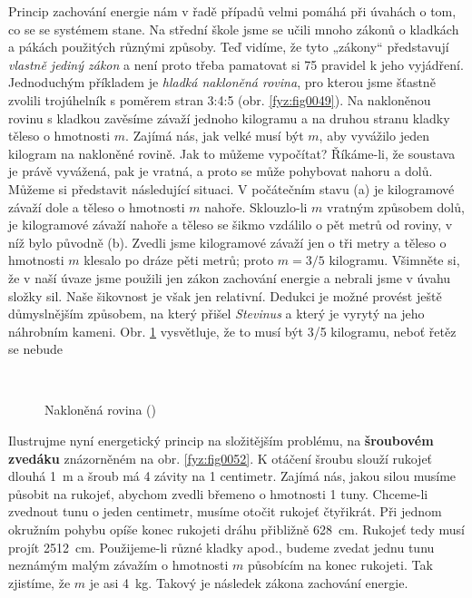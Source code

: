     Princip zachování energie nám v řadě případů velmi pomáhá při úvahách o tom, co se se systémem 
    stane. Na střední škole jsme se učili mnoho zákonů o kladkách a pákách použitých různými 
    způsoby. Teď vidíme, že tyto „zákony“ představují \emph{vlastně jediný zákon} a není proto 
    třeba pamatovat si \num{75} pravidel k jeho vyjádření. Jednoduchým příkladem je \emph{hladká 
    nakloněná rovina}, pro kterou jsme šťastně zvolili trojúhelník s poměrem stran 
    \num{3}:\num{4}:\num{5} (obr. \ref{fyz:fig0049}). Na nakloněnou rovinu s kladkou zavěsíme závaží 
    jednoho kilogramu a na druhou stranu kladky těleso o hmotnosti \(m\). Zajímá nás, jak velké 
    musí být \(m\), aby vyvážilo jeden kilogram na nakloněné rovině. Jak to můžeme vypočítat? 
    Říkáme-li, že soustava je právě vyvážená, pak je vratná, a proto se může pohybovat nahoru a 
    dolů. Můžeme si představit následující situaci. V počátečním stavu (a) je kilogramové závaží 
    dole a těleso o hmotnosti \(m\) nahoře. Sklouzlo-li \(m\) vratným způsobem dolů, je kilogramové 
    závaží nahoře a těleso se šikmo vzdálilo o pět metrů od roviny, v níž bylo původně (b). Zvedli 
    jsme kilogramové závaží jen o tři metry a těleso o hmotnosti \(m\) klesalo po dráze pěti metrů; 
    proto \(m = 3/5\) kilogramu. Všimněte si, že v naší úvaze jsme použili jen zákon zachování 
    energie a nebrali jsme v úvahu složky sil. Naše šikovnost je však jen relativní. Dedukci je 
    možné provést ještě důmyslnějším způsobem, na který přišel \emph{Stevinus} a který je vyrytý na 
    jeho náhrobním kameni. Obr. \ref{fyz:fig0050} vysvětluje, že to musí být 3/5 kilogramu, neboť 
    řetěz se nebude

    \begin{figure}[ht!]  %
      \centering
         \\
      \caption{Nakloněná rovina (\cite[s.~55]{Feynman01})}
      \label{fyz:fig0050}
    \end{figure}
      
    Ilustrujme nyní energetický princip na složitějším problému, na \textbf{šroubovém zvedáku} 
    znázorněném na obr. \ref{fyz:fig0052}. K otáčení šroubu slouží rukojeť dlouhá \SI{1}{\m} a šroub 
    má \num{4} závity na \num{1} centimetr. Zajímá nás, jakou silou musíme působit na rukojeť, 
    abychom zvedli břemeno o hmotnosti \num{1} tuny. Chceme-li zvednout tunu o jeden centimetr, 
    musíme otočit rukojeť čtyřikrát. Při jednom okružním pohybu opíše konec rukojeti dráhu 
    přibližně \SI{628}{\cm}. Rukojeť tedy musí projít \SI{2512}{\cm}. Použijeme-li různé kladky 
    apod., budeme zvedat jednu tunu neznámým malým závažím o hmotnosti \(m\) působícím na konec 
    rukojeti. Tak zjistíme, že \(m\) je asi \SI{4}{\kg}. Takový je následek zákona zachování 
    energie.

